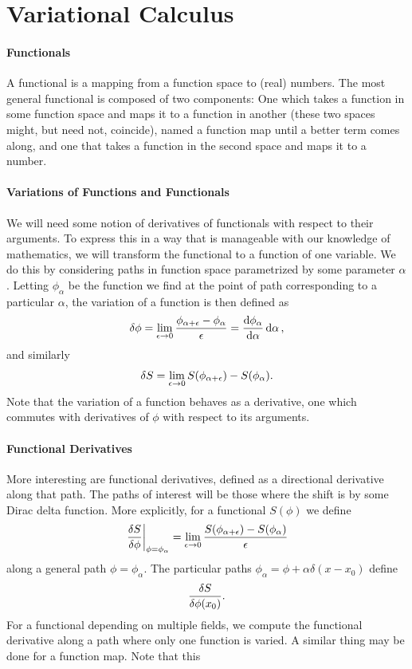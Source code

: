 \section{Variational Calculus}

\paragraph{Functionals}
A functional is a mapping from a function space to (real) numbers. The most general functional is composed of two components: One which takes a function in some function space and maps it to a function in another (these two spaces might, but need not, coincide), named a function map until a better term comes along, and one that takes a function in the second space and maps it to a number.

\paragraph{Variations of Functions and Functionals}
We will need some notion of derivatives of functionals with respect to their arguments. To express this in a way that is manageable with our knowledge of mathematics, we will transform the functional to a function of one variable. We do this by considering paths in function space parametrized by some parameter $\alpha$. Letting $\phi_{\alpha}$ be the function we find at the point of path corresponding to a particular $\alpha$, the variation of a function is then defined as
\begin{align*}
	\var{\phi} = \lim\limits_{\epsilon\to 0}\frac{\phi_{\alpha + \epsilon} - \phi_{\alpha}}{\epsilon} =  \dv{\phi_{\alpha}}{\alpha}\dd{\alpha},
\end{align*}
and similarly
\begin{align*}
	\var{S} = \lim\limits_{\epsilon\to 0}S(\phi_{\alpha + \epsilon}) - S(\phi_{\alpha}).
\end{align*}
Note that the variation of a function behaves as a derivative, one which commutes with derivatives of $\phi$ with respect to its arguments.

\paragraph{Functional Derivatives}
More interesting are functional derivatives, defined as a directional derivative along that path. The paths of interest will be those where the shift is by some Dirac delta function. More explicitly, for a functional $S(\phi)$ we define
\begin{align*}
	\eval{\fdv{S}{\phi}}_{\phi = \phi_{\alpha}} = \lim\limits_{\epsilon\to 0}\frac{S(\phi_{\alpha + \epsilon}) - S(\phi_{\alpha})}{\epsilon}
\end{align*}
along a general path $\phi = \phi_{\alpha}$. The particular paths $\phi_{\alpha} = \phi + \alpha\delta(x - x_{0})$ define
\begin{align*}
	\fdv{S}{\phi(x_{0})}.
\end{align*}
For a functional depending on multiple fields, we compute the functional derivative along a path where only one function is varied. A similar thing may be done for a function map. Note that this 

